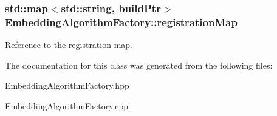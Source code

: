 \subsubsection[{\texorpdfstring{registration\+Map}{registrationMap}}]{\setlength{\rightskip}{0pt plus 5cm}std\+::map$<$std\+::string, build\+Ptr$>$ Embedding\+Algorithm\+Factory\+::registration\+Map\hspace{0.3cm}{\ttfamily [protected]}}\hypertarget{a00053_aa3bbf5d1683ddd7194f981f0af67e95a}{}\label{a00053_aa3bbf5d1683ddd7194f981f0af67e95a}
Reference to the registration map. 

The documentation for this class was generated from the following files\+:\begin{DoxyCompactItemize}
\item 
Embedding\+Algorithm\+Factory.\+hpp\item 
Embedding\+Algorithm\+Factory.\+cpp\end{DoxyCompactItemize}
